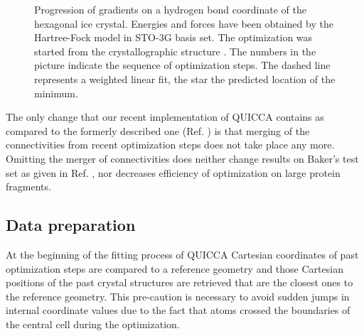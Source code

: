 \documentclass[prl,aps,preprint,superbib,12pt]{revtex4}
\begin{document}
\begin{figure}[h]
\caption{
Progression of gradients on a hydrogen bond coordinate
of the hexagonal ice crystal.
Energies and forces have been obtained by the Hartree-Fock
model in STO-3G basis set.
The optimization was started from the crystallographic structure
\cite{AGoto90}.
The numbers in the picture
indicate the sequence of optimization steps. The dashed line represents
a weighted linear fit, the star the predicted location of the minimum.}
\label{iceIh}
\end{figure}

The only change that our recent implementation of QUICCA contains as 
compared to the formerly described one (Ref. )
is that merging of the connectivities from recent optimization steps
does not take place any more. Omitting the merger of connectivities
does neither change results on Baker's test set as given 
in Ref. , nor decreases efficiency of optimization
on large protein fragments.

\subsection{Data preparation}
At the beginning of the fitting process of QUICCA
Cartesian coordinates of past optimization steps are compared to a
reference geometry and those Cartesian positions of the past 
crystal structures are retrieved that are the closest ones
to the reference geometry. This pre-caution is necessary
to avoid sudden jumps in internal coordinate values due to the
fact that atoms crossed the boundaries of the central cell during 
the optimization.
\end{document}
